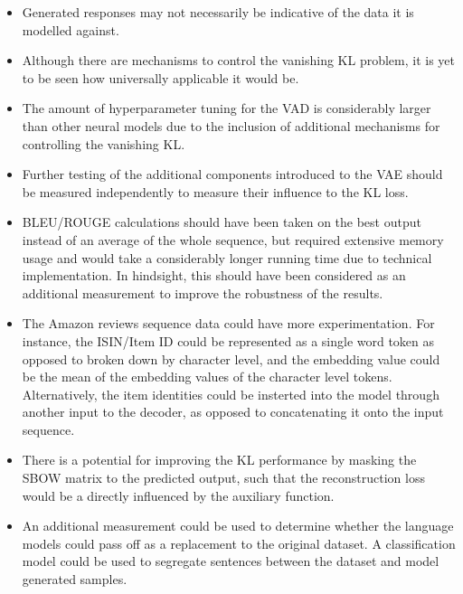 \documentclass[12pt,twoside]{report}
\begin{document}

\begin{itemize}  
\item Generated responses may not necessarily be indicative of the data it is modelled against.
\item Although there are mechanisms to control the vanishing KL problem, it is yet to be seen how universally applicable it would be.
\item The amount of hyperparameter tuning for the VAD is considerably larger than other neural models due to the inclusion of additional mechanisms for controlling the vanishing KL.
\item Further testing of the additional components introduced to the VAE should be measured independently to measure their influence to the KL loss. 
\item BLEU/ROUGE calculations should have been taken on the best output instead of an average of the whole sequence, but required extensive memory usage and would take a considerably longer running time due to technical implementation. In hindsight, this should have been considered as an additional measurement to improve the robustness of the results.
\item The Amazon reviews sequence data could have more experimentation. For instance, the ISIN/Item ID could be represented as a single word token as opposed to broken down by character level, and the  embedding value could be the mean of the embedding values of the character level tokens. Alternatively, the item identities could be insterted into the model through another input to the decoder, as opposed to concatenating it onto the input sequence. 
\item There is a potential for improving the KL performance by masking the SBOW matrix to the predicted output, such that the reconstruction loss would be a directly influenced by the auxiliary function.
\item An additional measurement could be used to determine whether the language models could pass off as a replacement to the original dataset. A classification model could be used to segregate sentences between the dataset and model generated samples. 
\end{itemize}


\end{document}
